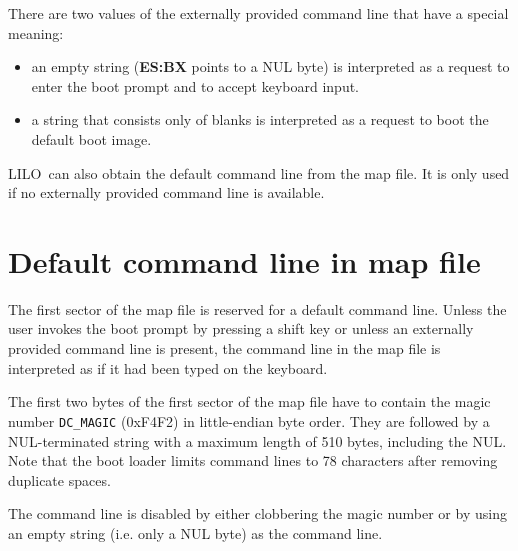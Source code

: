 \documentclass[fullpage]{article}
\def\LILO{LILO}
\begin{document}
There are two values of the externally provided command line that have a
special meaning:

\begin{itemize}
  \item an empty string ({\bf ES:BX} points to a NUL byte) is interpreted
    as a request to enter the boot prompt and to accept keyboard input.
  \item a string that consists only of blanks is interpreted as a request
    to boot the default boot image.
\end{itemize}

\LILO\ can also obtain the default command line from the map file. It
is only used if no externally provided command line is available.


\section{Default command line in map file}

The first sector of the map file is reserved for a default command line.
Unless the user invokes the boot prompt by pressing a shift key or unless an
externally provided command line is present, the command line in the map
file is interpreted as if it had been typed on the keyboard.

The first two bytes of the first sector of the map file have to contain
the magic number {\tt DC\_MAGIC} (0xF4F2) in little-endian byte order.
They are followed by a NUL-terminated string with a maximum length of
510 bytes, including the NUL. Note that the boot loader limits command
lines to 78 characters after removing duplicate spaces.

The command line is disabled by either clobbering the magic number or
by using an empty string (i.e. only a NUL byte) as the command line.
\end{document}
